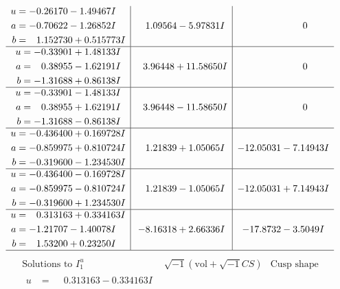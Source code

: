 \documentclass[1p]{elsarticle_modified}
\theoremstyle{definition}
\newcommand{\I}{\sqrt{-1}}
\begin{document}
$$\begin{array}{c|c|c}
\begin{aligned}
u &= -0.26170 - 1.49467 I \\
a &= -0.70622 - 1.26852 I \\
b &= \phantom{-}1.152730 + 0.515773 I\end{aligned}
 & \phantom{-}1.09564 - 5.97831 I & \phantom{-0.000000 } 0 \\ \hline\begin{aligned}
u &= -0.33901 + 1.48133 I \\
a &= \phantom{-}0.38955 - 1.62191 I \\
b &= -1.31688 + 0.86138 I\end{aligned}
 & \phantom{-}3.96448 + 11.58650 I & \phantom{-0.000000 } 0 \\ \hline\begin{aligned}
u &= -0.33901 - 1.48133 I \\
a &= \phantom{-}0.38955 + 1.62191 I \\
b &= -1.31688 - 0.86138 I\end{aligned}
 & \phantom{-}3.96448 - 11.58650 I & \phantom{-0.000000 } 0 \\ \hline\begin{aligned}
u &= -0.436400 + 0.169728 I \\
a &= -0.859975 + 0.810724 I \\
b &= -0.319600 - 1.234530 I\end{aligned}
 & \phantom{-}1.21839 + 1.05065 I & -12.05031 - 7.14943 I \\ \hline\begin{aligned}
u &= -0.436400 - 0.169728 I \\
a &= -0.859975 - 0.810724 I \\
b &= -0.319600 + 1.234530 I\end{aligned}
 & \phantom{-}1.21839 - 1.05065 I & -12.05031 + 7.14943 I \\ \hline\begin{aligned}
u &= \phantom{-}0.313163 + 0.334163 I \\
a &= -1.21707 - 1.40078 I \\
b &= \phantom{-}1.53200 + 0.23250 I\end{aligned}
 & -8.16318 + 2.66336 I & -17.8732 - 3.5049 I\\
 \hline 
 \end{array}$$\newpage$$\begin{array}{c|c|c}  
\text{Solutions to }I^u_{1}& \I (\text{vol} + \sqrt{-1}CS) & \text{Cusp shape}\\
 \hline 
\begin{aligned}
u &= \phantom{-}0.313163 - 0.334163 I \\

\end{aligned}
\end{array}$$
\end{document}
